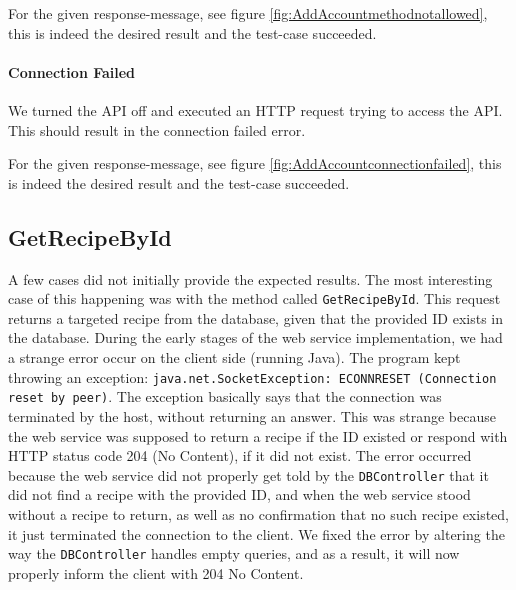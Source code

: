 For the given response-message, see figure \ref{fig:AddAccountmethodnotallowed}, this is indeed the desired result and the test-case succeeded.
\paragraph{Connection Failed}
We turned the API off and executed an HTTP request trying to access the API. This should result in the connection failed error. 

For the given response-message, see figure \ref{fig:AddAccountconnectionfailed}, this is indeed the desired result and the test-case succeeded.

\subsection{GetRecipeById}
A few cases did not initially provide the expected results. The most interesting case of this happening was with the method called \texttt{GetRecipeById}.
This request returns a targeted recipe from the database, given that the provided ID exists in the database. During the early stages of the web service implementation, we had a strange error occur on the client side (running Java). The program kept throwing an exception: \texttt{java.net.SocketException: ECONNRESET (Connection reset by peer)}\cite{socketexception}. The exception basically says that the connection was terminated by the host, without returning an answer. This was strange because the web service was supposed to return a recipe if the ID existed or respond with HTTP status code 204 (No Content), if it did not exist. The error occurred because the web service did not properly get told by the \texttt{DBController} that it did not find a recipe with the provided ID, and when the web service stood without a recipe to return, as well as no confirmation that no such recipe existed, it just terminated the connection to the client. We fixed the error by altering the way the \texttt{DBController} handles empty queries, and as a result, it will now properly inform the client with 204 No Content.



